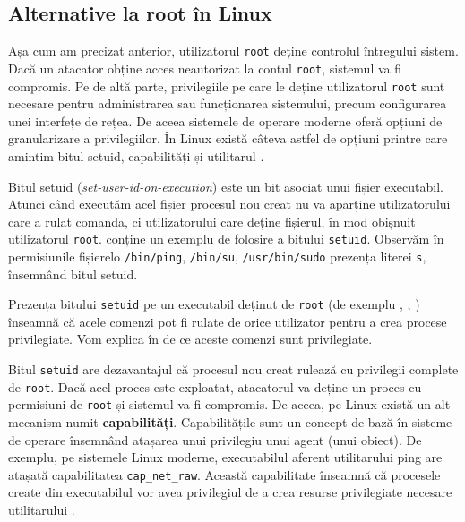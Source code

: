 \subsection{Alternative la root în Linux}
\label{sec:user:altroot}

Așa cum am precizat anterior, utilizatorul \texttt{root} deține controlul întregului sistem.
Dacă un atacator obține acces neautorizat la contul \texttt{root}, sistemul va fi compromis.
Pe de altă parte, privilegiile pe care le deține utilizatorul \texttt{root} sunt necesare pentru administrarea sau funcționarea sistemului, precum configurarea unei interfețe de rețea.
De aceea sistemele de operare moderne oferă opțiuni de granularizare a privilegiilor.
În Linux există câteva astfel de opțiuni printre care amintim bitul setuid, capabilități și utilitarul .

Bitul setuid (\textit{set-user-id-on-execution}) este un bit asociat unui fișier executabil.
Atunci când executăm acel fișier procesul nou creat nu va aparține utilizatorului care a rulat comanda, ci utilizatorului care deține fișierul, în mod obișnuit utilizatorul \texttt{root}.
 conține un exemplu de folosire a bitului \texttt{setuid}.
Observăm în permisiunile fișierelo \texttt{/bin/ping}, \texttt{/bin/su}, \texttt{/usr/bin/sudo} prezența literei \texttt{s}, însemnând bitul setuid.


Prezența bitului \texttt{setuid} pe un executabil deținut de \texttt{root} (de exemplu , , ) înseamnă că acele comenzi pot fi rulate de orice utilizator pentru a crea procese privilegiate.
Vom explica în  de ce aceste comenzi sunt privilegiate.

Bitul \texttt{setuid} are dezavantajul că procesul nou creat rulează cu privilegii complete de \texttt{root}.
Dacă acel proces este exploatat, atacatorul va deține un proces cu permisiuni de \texttt{root} și sistemul va fi compromis.
De aceea, pe Linux există un alt mecanism numit \textbf{capabilități}.
Capabilitățile sunt un concept de bază în sisteme de operare însemnând atașarea unui privilegiu unui agent (unui obiect).
De exemplu, pe sistemele Linux moderne, executabilul aferent utilitarului ping are atașată capabilitatea \texttt{cap\_net\_raw}.
Această capabilitate înseamnă că procesele create din executabilul  vor avea privilegiul de a crea resurse privilegiate necesare utilitarului .

